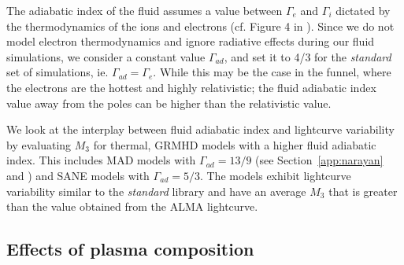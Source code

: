 The adiabatic index of the fluid assumes a value between $\Gamma_{e}$ and $\Gamma_{i}$ dictated by the thermodynamics of the ions and electrons (cf. Figure 4 in \citealt{10.1093/mnras/stw3116}). Since we do not model electron thermodynamics and ignore radiative effects during our fluid simulations, we consider a constant value $\Gamma_{ad}$, and set it to 4/3 for the \textit{standard} set of simulations, ie. $\Gamma_{ad}=\Gamma_{e}$. While this may be the case in the funnel, where the electrons are the hottest and highly relativistic; the fluid adiabatic index value away from the poles can be higher than the relativistic value.

We look at the interplay between fluid adiabatic index and lightcurve variability by evaluating $M_{3}$ for thermal, GRMHD models with a higher fluid adiabatic index. This includes MAD models with $\Gamma_{ad}=13/9$ (see Section~\ref{app:narayan} and  \citealt{2021arXiv210812380N}) and SANE models with $\Gamma_{ad}=5/3$. The models exhibit lightcurve variability similar to the \textit{standard} library and have an average $M_{3}$ that is greater than the value obtained from the ALMA lightcurve. 

\subsection{Effects of plasma composition}\label{app:helium}


